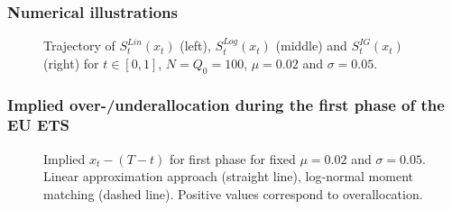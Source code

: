 \begin{frame}
  \frametitle{Numerical illustrations}
\begin{center}
\begin{figure}[h!]
\centering
{}
\caption{Trajectory of $S_t^{Lin}(x_t)$ (left), $S_t^{Log}(x_t)$ (middle) and $S_t^{IG}(x_t)$ (right) for $t \in [0,1]$,  $N = Q_0 = 100$, $\mu = 0.02$ and $\sigma = 0.05$.}
\label{fig:plot8}
\end{figure}
\end{center}
\end{frame}


\begin{frame}
  \frametitle{Implied over-/underallocation during the first phase of the EU ETS}
\begin{center}
\begin{figure}[h!]
\centering
{}
\caption{\tiny Implied $x_t - (T-t)$ for first phase for fixed  $\mu = 0.02$ and $\sigma = 0.05$. Linear approximation approach (straight line), log-normal moment matching (dashed line). Positive values correspond to overallocation.}
\label{fig:plot10}
\end{figure}
\end{center}
\end{frame}



\frame{\frametitle{Permit price Delta}
For $t \in [0,T)$ and $q_{[0,t]} < N$
\begin{itemize}
\item<1->
$$
\frac{dS_t^{Lin}}{dx_t}(x_t) := \ - \frac{P e^{-r \tau}}{\sigma\sqrt{\tau}} \cdot \frac{1}{x_t} \phi \left( \frac{-\ln\left( \frac{1}{\tau} x_t \right) + \left( \mu - \frac{\sigma^2}{2} \right) \tau}{\sigma \sqrt{\tau}}\right) < 0
$$
\item<2->
$$
\frac{S_t^{Lin}((1+h)x_t)-S_t^{Lin}(x_t)}{S_t^{Lin}(x_t)}=
  -\frac{\phi \left( \frac{-\ln\left( \frac{1}{\tau} x_t \right) + \left( \mu - \frac{\sigma^2}{2} \right) \tau}{\sigma \sqrt{\tau}}\right)}{\Phi \left( \frac{-\ln\left( \frac{1}{\tau} x_t \right) + \left( \mu - \frac{\sigma^2}{2} \right) \tau}{\sigma \sqrt{\tau}}\right)}\cdot \frac{h}{\sigma \sqrt{\tau}}
$$
\end{itemize}
}


